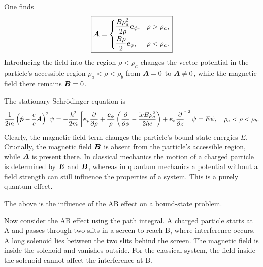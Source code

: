 One finds
\begin{equation}
\boxed{\bm{A}=\begin{cases}
\dfrac{B\rho_a^2}{2\rho}\bm{e}_\phi,&\rho>\rho_a,\\[6pt]
\dfrac{B\rho}{2}\bm{e}_\phi,&\rho<\rho_a.
\end{cases}}
\end{equation}
Introducing the field into the region $\rho<\rho_a$ changes the vector potential in the particle's accessible region $\rho_a<\rho<\rho_b$ from $\bm{A}=0$ to $\bm{A}\ne0$, while the magnetic field there remains $\bm{B}=0$.

The stationary Schr\"odinger equation is
\begin{equation}
\frac1{2m}\left(\hat{\bm{p}}-\frac ec\bm{A}\right)^2\psi
=-\frac{\hbar^2}{2m}\left[
\bm{e}_\rho\frac{\partial}{\partial\rho}
+\frac{\bm{e}_\phi}{\rho}\left(\frac{\partial}{\partial\phi}
-\frac{\mathrm{i} e B\rho_a^2}{2\hbar c}\right)
+\bm{e}_z\frac{\partial}{\partial z}\right]^2\psi
=E\psi,\quad\rho_a<\rho<\rho_b.
\end{equation}
Clearly, the magnetic-field term changes the particle's bound-state energies $E$. Crucially, the magnetic field $\bm{B}$ is absent from the particle's accessible region, while $\bm{A}$ is present there. In classical mechanics the motion of a charged particle is determined by $\bm{E}$ and $\bm{B}$, whereas in quantum mechanics a potential without a field strength can still influence the properties of a system. This is a purely quantum effect.

The above is the influence of the AB effect on a bound-state problem.

Now consider the AB effect using the path integral. A charged particle starts at A and passes through two slits in a screen to reach B, where interference occurs. A long solenoid lies between the two slits behind the screen. The magnetic field is inside the solenoid and vanishes outside. For the classical system, the field inside the solenoid cannot affect the interference at B.

